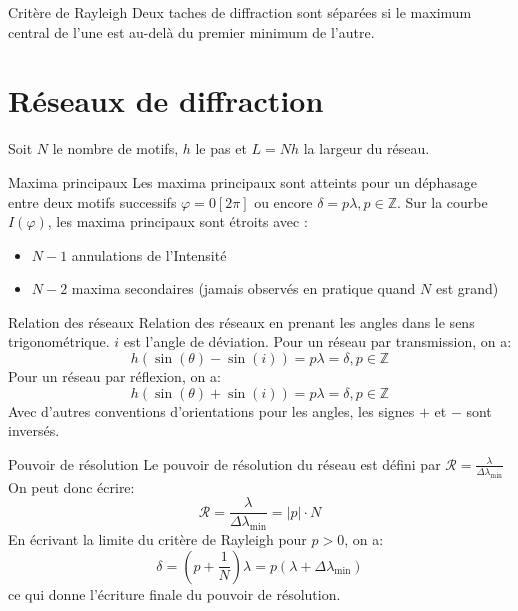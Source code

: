 \documentclass[french, a4paper, 11pt, twocolumn]{article}
\newcommand{\Z}{\mathbb{Z}}   %
\newcommand{\po}{\left(}         %
\newcommand{\pf}{\right)}        %
\newcommand{\pof}[1]{\po #1 \pf} %
\begin{document}
\begin{cadre}{Critère de Rayleigh}
  Deux taches de diffraction sont séparées si le maximum central de l'une est au-delà
  du premier minimum de l'autre.
\end{cadre}

\section{Réseaux de diffraction}
Soit \(N\) le nombre de motifs, \(h\) le pas et \(L=Nh\) la largeur du réseau.

\begin{cadre}{Maxima principaux}
  Les maxima principaux sont atteints pour un déphasage entre deux motifs successifs
  \(\varphi=0[2\pi]\) ou encore \(\delta=p\lambda, p \in \Z\).
  Sur la courbe \(I(\varphi)\), les maxima principaux sont étroits avec :
  \begin{itemize}
    \item \(N-1\) annulations de l'Intensité
    \item \(N-2\) maxima secondaires (jamais observés en pratique quand \(N\) est grand)
  \end{itemize}
\end{cadre}

\begin{cadre}{Relation des réseaux}
  Relation des réseaux en prenant les angles dans le sens trigonométrique. \(i\) est l'angle de déviation.
  Pour un réseau par transmission, on a:
  \[h(\sin(\theta)-\sin(i))=p\lambda=\delta, p \in \Z\]
  Pour un réseau par réflexion, on a:
  \[h(\sin(\theta)+\sin(i))=p\lambda=\delta, p \in \Z\]
  \tcblower
  Avec d'autres conventions d'orientations pour les angles, les signes \og \(+\)\fg{} et \og \(-\)\fg{} sont inversés.
\end{cadre}

\begin{cadre}{Pouvoir de résolution}
  Le pouvoir de résolution du réseau est défini par
  \(\mathcal{R}=\frac{\lambda}{\Delta\lambda_{\text{min}}}\)
  On peut donc écrire:
  \[\mathcal{R}=\frac{\lambda}{\Delta\lambda_{\text{min}}}=\lvert p\rvert\cdot N\]
  \tcblower
  En écrivant la limite du critère de Rayleigh pour \(p>0\), on a:
  \[\delta=\pof{p+\frac{1}{N}}\lambda=p\pof{\lambda + \Delta\lambda_{\text{min}}}\]
  ce qui donne l'écriture finale du pouvoir de résolution.
\end{cadre}
\end{document}
